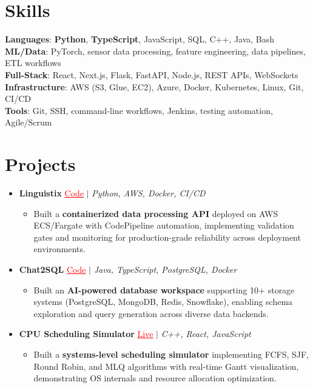 \documentclass[letterpaper,10pt]{article}
\newcommand{\resumeItem}[1]{\item\small{{#1 \vspace{-2pt}}}}
\newcommand{\resumeProjectHeading}[1]{\item \small #1 \vspace{-2pt}}
\newcommand{\resumeSubHeadingListStart}{\begin{itemize}[leftmargin=0.0in, label={}]}
\newcommand{\resumeSubHeadingListEnd}{\end{itemize}}
\newcommand{\resumeProjItemListStart}{\begin{itemize}[leftmargin=0.15in,label=\textbullet,itemsep=0pt,topsep=0pt,parsep=0pt,partopsep=0pt]}
\newcommand{\resumeProjItemListEnd}{\end{itemize}\vspace{-4pt}}
\begin{document}
\section{Skills}
\begin{itemize}[leftmargin=0.15in, label={}]
\small{\item{
\textbf{Languages}: \textbf{Python}, \textbf{TypeScript}, JavaScript, SQL, C++, Java, Bash \\
\textbf{ML/Data}: PyTorch, sensor data processing, feature engineering, data pipelines, ETL workflows \\
\textbf{Full-Stack}: React, Next.js, Flask, FastAPI, Node.js, REST APIs, WebSockets \\
\textbf{Infrastructure}: AWS (S3, Glue, EC2), Azure, Docker, Kubernetes, Linux, Git, CI/CD \\
\textbf{Tools}: Git, SSH, command-line workflows, Jenkins, testing automation, Agile/Scrum
}}
\end{itemize}
\vspace{-16pt}
\section{Projects}
\resumeSubHeadingListStart
\vspace{-2pt}
\resumeProjectHeading{\textbf{Linguistix} {\href{https://github.com/SAHAJ-BHADJA/Linguistix}{\textcolor{red}{\underline{Code}}}} $|$ \emph{Python, AWS, Docker, CI/CD}}
\resumeProjItemListStart
\resumeItem{Built a \textbf{containerized data processing API} deployed on AWS ECS/Fargate with CodePipeline automation, implementing validation gates and monitoring for production-grade reliability across deployment environments.}
\resumeProjItemListEnd
\vspace{3pt}
\resumeProjectHeading{\textbf{Chat2SQL} {\href{https://github.com/SAHAJ-BHADJA/Chat2SQL}{\textcolor{red}{\underline{Code}}}} $|$ \emph{Java, TypeScript, PostgreSQL, Docker}}
\resumeProjItemListStart
\resumeItem{Built an \textbf{AI-powered database workspace} supporting 10+ storage systems (PostgreSQL, MongoDB, Redis, Snowflake), enabling schema exploration and query generation across diverse data backends.}
\resumeProjItemListEnd
\vspace{3pt}
\resumeProjectHeading{\textbf{CPU Scheduling Simulator} {\href{https://cpu-scheduler-amber.vercel.app/}{\textcolor{red}{\underline{Live}}}} $|$ \emph{C++, React, JavaScript}}
\resumeProjItemListStart
\resumeItem{Built a \textbf{systems-level scheduling simulator} implementing FCFS, SJF, Round Robin, and MLQ algorithms with real-time Gantt visualization, demonstrating OS internals and resource allocation optimization.}
\resumeProjItemListEnd
\resumeSubHeadingListEnd
\end{document}
